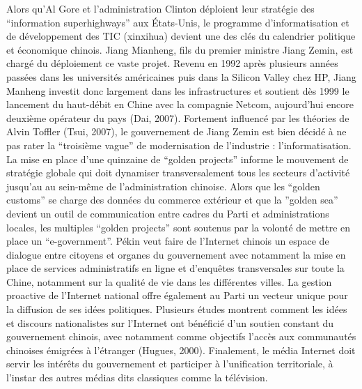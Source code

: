 {\color{black}
Alors qu'Al Gore et l'administration Clinton d\'eploient leur strat\'egie des ``information superhighways'' aux
\'Etats-Unis, le programme d'informatisation et de d\'eveloppement des TIC (xinxihua) devient une des cl\'es du
calendrier politique et \'economique chinois. Jiang Mianheng, fils du premier ministre Jiang Zemin, est charg\'e du
d\'eploiement ce vaste projet. Revenu en 1992 apr\`es plusieurs ann\'ees pass\'ees dans les universit\'es am\'ericaines
puis dans la Silicon Valley chez HP, Jiang Manheng investit donc largement dans les infrastructures et soutient d\`es
1999 le lancement du haut-d\'ebit en Chine avec la compagnie Netcom, aujourd'hui encore deuxi\`eme op\'erateur du pays
(Dai, 2007). Fortement influenc\'e par les th\'eories de Alvin Toffler (Tsui, 2007), le gouvernement de Jiang Zemin est
bien d\'ecid\'e \`a ne pas rater la ``troisi\`eme vague'' de modernisation de l'industrie : l'informatisation. La mise
en place d'une quinzaine de ``golden projects'' informe le mouvement de strat\'egie globale qui doit dynamiser
transversalement tous les secteurs d'activit\'e jusqu'au au sein-m\^eme de l'administration chinoise. Alors que les
``golden customs'' se charge des donn\'ees du commerce ext\'erieur et que la ''golden sea'' devient un outil de
communication entre cadres du Parti et administrations locales, les multiples ``golden projects'' sont soutenus par la
volont\'e de mettre en place un ``e-government''. P\'ekin veut faire de l'Internet chinois un espace de dialogue entre
citoyens et organes du gouvernement avec notamment la mise en place de services administratifs en ligne et d'enqu\^etes
transversales sur toute la Chine, notamment sur la qualit\'e de vie dans les diff\'erentes villes. La gestion proactive
de l'Internet national offre \'egalement au Parti un vecteur unique pour la diffusion de ses id\'ees politiques.
Plusieurs \'etudes montrent comment les id\'ees et discours nationalistes sur l'Internet ont b\'en\'efici\'e d'un
soutien constant du gouvernement chinois, avec notamment comme objectifs l'acc\`es aux communaut\'es chinoises
\'emigr\'ees \`a l'\'etranger (Hugues, 2000). Finalement, le m\'edia Internet doit servir les int\'er\^ets du
gouvernement et participer \`a l'unification territoriale, \`a l'instar des autres m\'edias dits classiques comme la
t\'el\'evision. }

